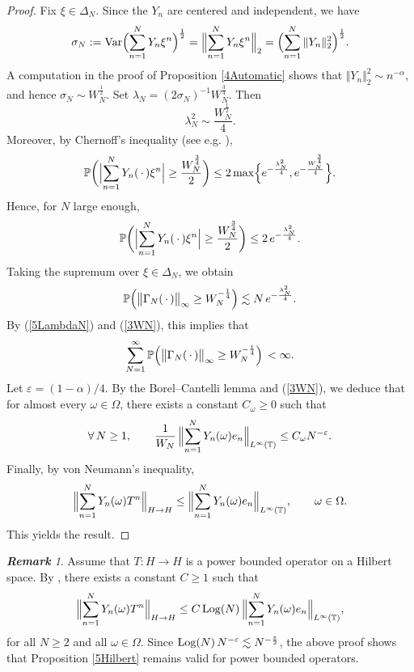 \documentclass[12pt]{amsart}
\newcommand{\Pdb}{\mbox{$\mathbb{P}$}}
\newcommand{\norm}[1]{\Vert#1\Vert}
\newcommand{\bignorm}[1]{\bigl\Vert#1\bigr\Vert}
\newcommand{\Bignorm}[1]{\Bigl\Vert#1\Bigr\Vert}
\theoremstyle{remark}
\newtheorem{remark}[theorem]{\bf Remark}
\theoremstyle{definition}
\numberwithin{equation}{section}
\begin{document}
\begin{proof}
Fix $\xi\in \Delta_N$. Since the
$Y_n$ are centered and independent, we have
$$
\sigma_N:=
{\rm Var}\Bigl(\sum_{n=1}^N
Y_n\xi^n\Bigr)^\frac12=\Bignorm{\sum_{n=1}^N
Y_n\xi^n}_2 = \Bigl(\sum_{n=1}^N \norm{Y_n}_2^2\Bigr)^\frac12.
$$
A computation in the proof of Proposition \ref{4Automatic}
shows that $\norm{Y_n}_2^2\sim n^{-\alpha}$, and hence 
$\sigma_N\sim W_N^\frac12.$
Set $\lambda_N=(2\sigma_N)^{-1}W_N^{\frac34}$. Then
\begin{equation}\label{5LambdaN}
\lambda_N^2\sim \frac{W_N^\frac12}{4}.
\end{equation}
Moreover, by Chernoff's inequality
(see e.g. \cite[Theorem 1.8]{Tao}), 
$$
\Pdb\biggl(\Bigl\vert\sum_{n=1}^N Y_n(\,\cdotp) \xi^n\Bigr\vert\geq 
\frac{W_N^\frac34}{2}\biggr)
\leq 2\max\Bigl\{e^{-\frac{\lambda_N^2}{4}},
e^{-\frac{W_N^\frac34}{4}}\Bigr\}.
$$
Hence, for $N$ large enough,
$$
\Pdb\biggl(\Bigl\vert\sum_{n=1}^N Y_n(\,\cdotp) \xi^n\Bigr\vert\geq 
\frac{W_N^\frac34}{2}\biggr)
\leq 2\,e^{-\frac{\lambda_N^2}{4}}.
$$
Taking the supremum over $\xi\in\Delta_N$, we obtain
$$
\Pdb\Bigl(\bignorm{\Gamma_N(\,\cdotp)}_\infty\geq W_N^{-\frac14} \Bigr)
\lesssim N \,e^{-\frac{\lambda_N^2}{4}}.
$$
By (\ref{5LambdaN}) and (\ref{3WN}), this implies that
$$
\sum_{N=1}^\infty\Pdb\Bigl( \bignorm{\Gamma_N(\,\cdotp)}_\infty\geq W_N^{-\frac14}  \Bigr)\,<\infty.
$$
Let $\varepsilon =(1-\alpha)/4$. 
By the Borel--Cantelli lemma and (\ref{3WN}), we deduce that for almost every $\omega\in \Omega$, there exists a constant
$C_\omega\geq 0$ such that 
$$
\forall\, N\geq 1,\qquad \frac{1}{W_{N}}\,\Bignorm{
\sum_{n=1}^N
Y_n(\omega) e_n}_{L^\infty(\mathbb T)}\leq C_\omega N^{-\varepsilon}.
$$
Finally, by von Neumann's inequality,
$$
\Bignorm{\sum_{n=1}^N Y_n(\omega) T^n}_{H\to H}
\leq \Bignorm{
\sum_{n=1}^N
Y_n(\omega) e_n}_{L^\infty(\mathbb T)},
\qquad\omega\in\Omega.
$$
This yields the result.
\end{proof}

\begin{remark} 
Assume that $T\colon H\to H$ 
is a power bounded operator on a Hilbert space. By \cite[Corollary 3.9]{Pe}, 
there exists a constant $C\geq 1$ such that 
$$
\Bignorm{\sum_{n=1}^N Y_n(\omega) T^n}_{H\to H}
\leq C\,{\rm Log}(N)\,\Bignorm{
\sum_{n=1}^N
Y_n(\omega) e_n}_{L^\infty(\mathbb T)},
$$
for all $N\geq 2$ and all $\omega\in\Omega$.
Since ${\rm Log}(N)\, N^{-\varepsilon}\lesssim 
N^{-\frac{\varepsilon}{2}}$, the above proof shows that Proposition \ref{5Hilbert} remains valid
for power bounded operators.
\end{remark}
\end{document}
